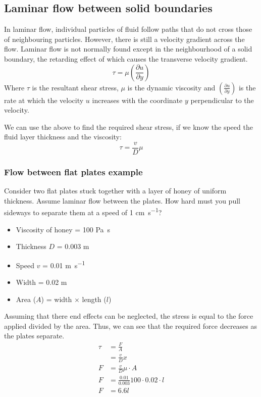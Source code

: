 \documentclass[class=report, crop=false, 12pt,a4paper]{standalone}
\begin{document}
\subsection{Laminar flow between solid boundaries}
In laminar flow, individual particles of fluid follow paths that do not cross those of neighbouring particles. However, there is still a velocity gradient across the flow. Laminar flow is not normally found except in the neighbourhood of a solid boundary, the retarding effect of which causes the transverse velocity gradient. 
\[ \tau = \mu \left( \frac{\partial u}{\partial y} \right) \]
Where \(\tau\) is the resultant shear stress, \(\mu\) is the dynamic viscosity and \(\left( \frac{\partial u}{\partial y} \right)\) is the rate at which the velocity \(u\) increases with the coordinate \(y\) perpendicular to the velocity.

We can use the above to find the required shear stress, if we know the speed the fluid layer thickness and the viscosity:
\[ \tau = \frac{v}{D}\mu \]
\subsubsection{Flow between flat plates example}
Consider two flat plates stuck together with a layer of honey of uniform thickness. Assume laminar flow between the plates. How hard must you pull sideways to separate them at a speed of 1 \si{\cm\per\second}?
\begin{itemize}[noitemsep]
  \item Viscosity of honey = 100 \si{\pascal \second}
  \item Thickness \(D\) = 0.003 \si{\meter}
  \item Speed \(v\) = 0.01 \si{\meter\per\second}
  \item Width = 0.02 \si{\meter}
  \item Area (\(A\)) = width \(\times\) length (\(l\))
\end{itemize}
Assuming that there end effects can be neglected, the stress is equal to the force applied divided by the area. Thus, we can see that the required force decreases as the plates separate.
\begin{align*}
  \tau &= \frac{F}{A}\\
  &= \frac{v}{D}x\\
  F &= \frac{v}{D}\mu \cdot A\\
  F &= \frac{0.01}{0.003}100 \cdot 0.02 \cdot l\\
  F &=6.6l
\end{align*}
\end{document}
